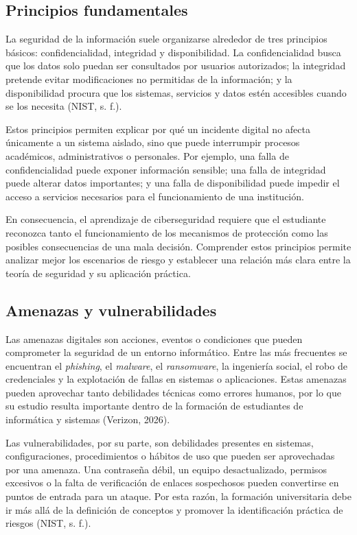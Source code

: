 \subsection{Principios fundamentales}

La seguridad de la información suele organizarse alrededor de tres principios básicos: confidencialidad, integridad y disponibilidad. La confidencialidad busca que los datos solo puedan ser consultados por usuarios autorizados; la integridad pretende evitar modificaciones no permitidas de la información; y la disponibilidad procura que los sistemas, servicios y datos estén accesibles cuando se los necesita (NIST, s. f.).

Estos principios permiten explicar por qué un incidente digital no afecta únicamente a un sistema aislado, sino que puede interrumpir procesos académicos, administrativos o personales. Por ejemplo, una falla de confidencialidad puede exponer información sensible; una falla de integridad puede alterar datos importantes; y una falla de disponibilidad puede impedir el acceso a servicios necesarios para el funcionamiento de una institución.

En consecuencia, el aprendizaje de ciberseguridad requiere que el estudiante reconozca tanto el funcionamiento de los mecanismos de protección como las posibles consecuencias de una mala decisión. Comprender estos principios permite analizar mejor los escenarios de riesgo y establecer una relación más clara entre la teoría de seguridad y su aplicación práctica.

\subsection{Amenazas y vulnerabilidades}

Las amenazas digitales son acciones, eventos o condiciones que pueden comprometer la seguridad de un entorno informático. Entre las más frecuentes se encuentran el \textit{phishing}, el \textit{malware}, el \textit{ransomware}, la ingeniería social, el robo de credenciales y la explotación de fallas en sistemas o aplicaciones. Estas amenazas pueden aprovechar tanto debilidades técnicas como errores humanos, por lo que su estudio resulta importante dentro de la formación de estudiantes de informática y sistemas (Verizon, 2026).

Las vulnerabilidades, por su parte, son debilidades presentes en sistemas, configuraciones, procedimientos o hábitos de uso que pueden ser aprovechadas por una amenaza. Una contraseña débil, un equipo desactualizado, permisos excesivos o la falta de verificación de enlaces sospechosos pueden convertirse en puntos de entrada para un ataque. Por esta razón, la formación universitaria debe ir más allá de la definición de conceptos y promover la identificación práctica de riesgos (NIST, s. f.).

